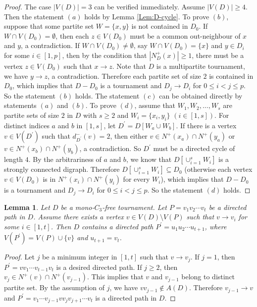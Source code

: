 \documentclass[10pt,a4paper]{article}
\newtheorem{lemma}{Lemma}
\theoremstyle{definition}
\begin{document}
\begin{proof}
    The case $|V(D)|=3$ can be verified immediately. Assume $|V(D)|\geq 4$. Then the statement $(a)$ holds by Lemma \ref{Lem:D-cycle}. To prove $(b)$, suppose that some partite set  $W=\{x,y\}$ is not contained in $D_0$. If $W\cap V(D_0)=\emptyset$, then each $z\in V(D_0)$ must be a common out-neighbour of $x$ and $y$, a contradiction. If $W\cap V(D_0)\neq \emptyset$, say $W\cap V(D_0)=\{x\}$ and $y\in D_i$ for some $i\in[1,p]$, then by the condition that $|N^+_D(x)|\geq 1$, there must be a vertex $z\in V(D_0)$ such that $x\rightarrow z$. Note that $D$ is a multipartite tournament, we have $y\rightarrow z$, a contradiction. Therefore each partite set of size $2$ is contained in $D_0$, which implies that $D-D_0$ is a tournament and $D_j\rightarrow D_i$ for $0\leq i<j\leq p$. So the statement $(b)$ holds. The statement $(c)$ can be obtained directly by statements $(a)$ and $(b)$.   To prove $(d)$, assume that  $W_1,W_2,\ldots,W_s$ are partite sets of size $2$ in $D$ with $s\geq2$ and  $W_i=\{x_i, y_i\}$ $(i\in[1,s])$. For distinct indices $a$ and $b$ in $[1,s]$, let $D^\prime=D[W_a\cup W_b]$. If there is a vertex  $v\in V(D^{\prime})$ such that $d^-_{D^{\prime}}(v)=2$, then either $v\in N^+(x_a) \cap N^+(y_a)$ or $v\in N^+(x_b) \cap N^+(y_b)$, a contradiction. So $D^{\prime}$ must be a directed cycle of length $4$. By the arbitrariness of $a$ and $b$,  we know that $D[\cup^s_{i=1}W_i]$ is a strongly connected digraph.  Therefore $D[\cup^s_{i=1}W_i]\subseteq D_0$ (otherwise each vertex $v\in V(D_0)$ is in $ N^+(x_i) \cap N^+(y_i)$ for every $W_i$),  which implies that $D-D_0$ is a tournament and $D_j\rightarrow D_i$ for $0\leq i<j\leq p$.  So the statement $(d)$ holds.
\end{proof}
\begin{lemma}\label{Lem:D-path}
    Let $D$ be a mono-$C_3$-free tournament. Let  ${P}=v_1v_2\cdots v_t $ be a directed path in $D$. Assume  there exists  a vertex $v\in V(D)\setminus V({P})$  such that   $v\rightarrow v_i$ for some $i\in[1, t]$.  Then $D$ contains a directed path ${P^{\prime}  }=u_1u_2\cdots u_{t+1}$,  where $V({P^{\prime}  })=V({P})\cup\{v \}$ and  $u_{t+1}=v_t$.
\end{lemma}
    \begin{proof}
        Let $j$ be a minimum integer in $[1,t]$ such that $v\rightarrow v_j$. If $j=1$, then ${P^{\prime}  }=vv_1\cdots v_{t-1}v_t$ is a desired directed path. If $j\geq 2$, then
        $v_j\in N^+(v)\cap N^+(v_{j-1})$. This implies that $v$ and $v_{j-1}$ belong to distinct partite set. By the assumption of $j$, we have $vv_{j-1}\not\in A(D)$. Therefore $v_{j-1}\rightarrow v$ and ${P^{\prime}  }=v_1 \cdots v_{j-1}vv_jv_{j+1}\cdots v_t$ is a directed path in $D$.
    \end{proof}
\end{document}
